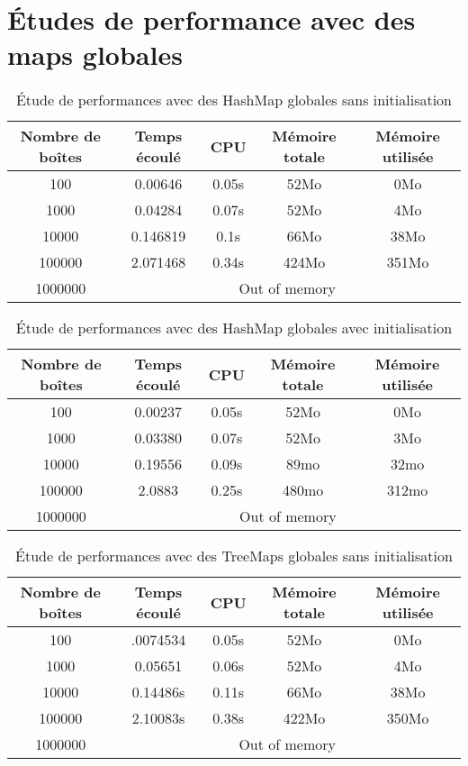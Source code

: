 \section{Études de performance avec des maps globales}
\begin{table}[h]
  \centering
\begin{tabular}{|c|c|c|c|c|}
\hline
Nombre de boîtes & Temps écoulé & CPU & Mémoire totale & Mémoire utilisée\\
\hline
100 & 0.00646& 0.05s & 52Mo & 0Mo\\
\hline
1000 & 0.04284 & 0.07s & 52Mo & 4Mo\\
\hline
10000 & 0.146819 & 0.1s & 66Mo & 38Mo\\
\hline
100000 &2.071468 & 0.34s & 424Mo & 351Mo\\
\hline
1000000 & \multicolumn{4}{|c|}{Out of memory}\\
\hline
\end{tabular}
\caption{Étude de performances avec des HashMap globales sans initialisation} 
\label{tab:hashmapglobal}
\end{table}


\begin{table}[h]
  \centering
\begin{tabular}{|c|c|c|c|c|}
\hline
Nombre de boîtes & Temps écoulé & CPU & Mémoire totale & Mémoire utilisée\\
\hline
100 & 0.00237& 0.05s & 52Mo & 0Mo\\
\hline
1000 & 0.03380 & 0.07s & 52Mo & 3Mo\\
\hline
10000 & 0.19556 & 0.09s & 89mo & 32mo\\
\hline
100000 & 2.0883 & 0.25s & 480mo & 312mo\\
\hline
1000000 & \multicolumn{4}{|c|}{Out of memory}\\
\hline
\end{tabular}
\caption{Étude de performances avec des HashMap globales avec initialisation}
\label{tab:hashmapglobalInit}
\end{table}









\begin{table}[h]
  \centering
\begin{tabular}{|c|c|c|c|c|}
\hline
Nombre de boîtes & Temps écoulé & CPU & Mémoire totale & Mémoire utilisée\\
\hline
100 & .0074534& 0.05s & 52Mo & 0Mo\\
\hline
1000 & 0.05651 & 0.06s & 52Mo & 4Mo\\
\hline
10000 & 0.14486s & 0.11s & 66Mo & 38Mo\\
\hline
100000 & 2.10083s & 0.38s & 422Mo & 350Mo\\
\hline
1000000 & \multicolumn{4}{|c|}{Out of memory}\\
\hline
\end{tabular}
\caption{Étude de performances avec des TreeMaps globales sans initialisation} 
\label{tab:treemapglobal}
\end{table}

